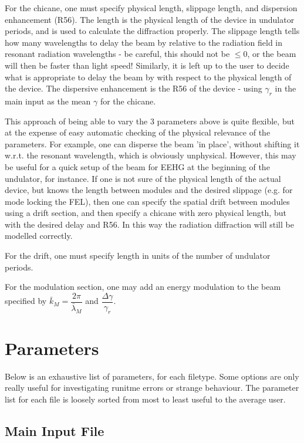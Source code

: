 \documentclass[12pt]{article}%
\begin{document}
For the chicane, one must specify physical length, slippage length, and dispersion enhancement (R56). The length is the physical length of the device in undulator periods, and is used to calculate the diffraction properly. The slippage length tells how many wavelengths to delay the beam by relative to the radiation field in resonant radiation wavelengths - be careful, this should not be $\leq 0$, or the beam will then be faster than light speed! Similarly, it is left up to the user to decide what is appropriate to delay the beam by with respect to the physical length of the device. The dispersive enhancement is the R56 of the device - using $\gamma_r$ in the main input as the mean $\gamma$ for the chicane. 

This approach of being able to vary the 3 parameters above is quite flexible, but at the expense of easy automatic checking of the physical relevance of the parameters. For example, one can disperse the beam 'in place', without shifting it w.r.t. the resonant wavelength, which is obviously unphysical. However, this may be useful for a quick setup of the beam for EEHG at the beginning of the undulator, for instance. If one is not sure of the physical length of the actual device, but knows the length between modules and the desired slippage (e.g. for mode locking the FEL), then one can specify the spatial drift between modules using a drift section, and then specify a chicane with zero physical length, but with the desired delay and R56. In this way the radiation diffraction will still be modelled correctly.

For the drift, one must specify length in units of the number of undulator periods.

For the modulation section, one may add an energy modulation to the beam specified by $\bar{k}_M = \dfrac{2 \pi}{\bar{\lambda}_M}$ and $\dfrac{\Delta \gamma}{\gamma_r}$.


\newpage


\section{Parameters}

Below is an exhaustive list of parameters, for each filetype. Some options are only really useful for investigating runitme errors or strange behaviour. The parameter list for each file is loosely sorted from most to least useful to the average user.


\subsection{Main Input File}
\end{document}
